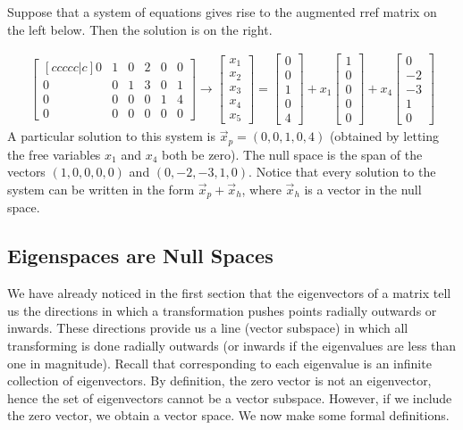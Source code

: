 \begin{example}
Suppose that a system of equations gives rise to the augmented rref matrix on the left below.  Then the solution is on the right.

\begin{align*}
\begin{bmatrix}[ccccc|c] 0&1&0&2&0&0\\0&0&1&3&0&1\\0&0&0&0&1&4\\0&0&0&0&0&0\end{bmatrix}
\longrightarrow
\begin{bmatrix}x_1\\x_2\\x_3\\x_4\\x_5\end{bmatrix} 
= \begin{bmatrix}0\\0\\1\\0\\4\end{bmatrix}
+x_1\begin{bmatrix}1\\0\\0\\0\\0\end{bmatrix}
+x_4\begin{bmatrix}0\\-2\\-3\\1\\0\end{bmatrix}  
\end{align*}
A particular solution to this system is $\vec x_p=(0,0,1,0,4)$ (obtained by letting the free variables $x_1$ and $x_4$ both be zero).  The null space is the span of the vectors $(1,0,0,0,0)$ and $(0,-2,-3,1,0)$. Notice that every solution to the system can be written in the form $\vec x_p +\vec x_h$, where $\vec x_h$ is a vector in the null space.
\end{example}
 
\subsection{Eigenspaces are Null Spaces}
We have already noticed in the first section that the eigenvectors of a matrix tell us the directions in which a transformation pushes points radially outwards or inwards.  These directions provide us a line (vector subspace) in which all transforming is done radially outwards (or inwards if the eigenvalues are less than one in magnitude).  Recall that corresponding to each eigenvalue is an infinite collection of eigenvectors. By definition, the zero vector is not an eigenvector, hence the set of eigenvectors cannot be a vector subspace.  However, if we include the zero vector, we obtain a vector space. We now make some formal definitions.

